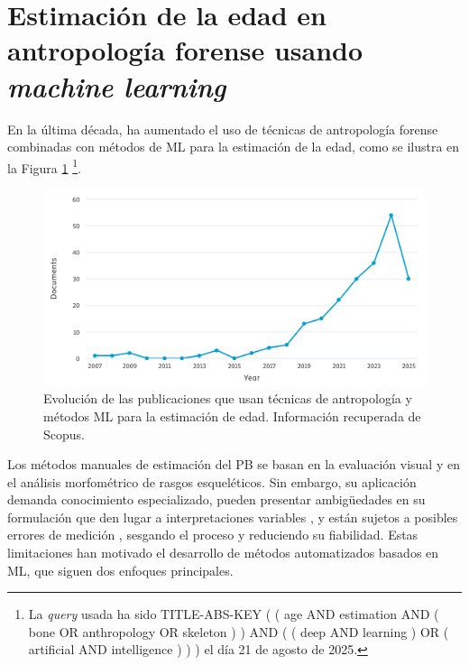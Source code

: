 
\section{Estimación de la edad en antropología forense usando \textit{machine learning}}

En la última década, ha aumentado el uso de técnicas de antropología forense combinadas con métodos de \acrshort{ML} para la estimación de la edad, como se ilustra en la Figura \ref{fig:num_papers_2}%
\footnote{
    La \textit{query} usada ha sido
    TITLE-ABS-KEY ( ( age AND estimation AND ( bone OR anthropology OR skeleton ) ) AND ( ( deep AND learning ) OR ( artificial AND intelligence ) ) )
    el día 21 de agosto de 2025.
}.

\begin{figure}[htbp]
    \centering
    \includegraphics[width=\textwidth]{capitulos/cap_03/imagenes/num_papers_2.png}
    \caption[
        Evolución de las publicaciones que usan técnicas de antropología y métodos ML para la estimación de edad. 
    ]{
        Evolución de las publicaciones que usan técnicas de antropología y métodos ML para la estimación de edad. 
        Información recuperada de Scopus.
    }
    \label{fig:num_papers_2}
\end{figure}

Los métodos manuales de estimación del \acrshort{PB} se basan en la evaluación visual y en el análisis morfométrico de rasgos esqueléticos. Sin embargo, su aplicación demanda conocimiento especializado, pueden presentar ambigüedades en su formulación que den lugar a interpretaciones variables \cite{berst2001}, y están sujetos a posibles errores de medición \cite{langley2018}, sesgando el proceso y reduciendo su fiabilidad. Estas limitaciones han motivado el desarrollo de métodos automatizados basados en \acrshort{ML}, que siguen dos enfoques principales. 

